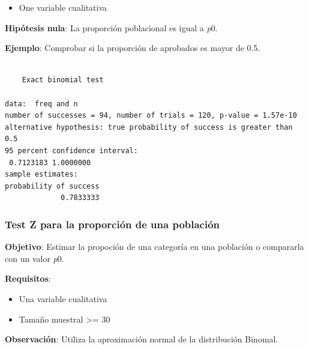 \documentclass[
  a4paper,
]{scrreport}
\newenvironment{Shaded}{\begin{snugshade}}{\end{snugshade}}
\newcommand{\AttributeTok}[1]{\textcolor[rgb]{0.40,0.45,0.13}{#1}}
\newcommand{\FloatTok}[1]{\textcolor[rgb]{0.68,0.00,0.00}{#1}}
\newcommand{\FunctionTok}[1]{\textcolor[rgb]{0.28,0.35,0.67}{#1}}
\newcommand{\NormalTok}[1]{\textcolor[rgb]{0.00,0.23,0.31}{#1}}
\newcommand{\OtherTok}[1]{\textcolor[rgb]{0.00,0.23,0.31}{#1}}
\newcommand{\SpecialCharTok}[1]{\textcolor[rgb]{0.37,0.37,0.37}{#1}}
\newcommand{\StringTok}[1]{\textcolor[rgb]{0.13,0.47,0.30}{#1}}
\providecommand{\tightlist}{%
  \setlength{\itemsep}{0pt}\setlength{\parskip}{0pt}}\usepackage{longtable,booktabs,array}
\theoremstyle{definition}
\theoremstyle{definition}
\theoremstyle{remark}
\begin{document}
\begin{itemize}
\tightlist
\item
  One variable cualitativa
\end{itemize}

\textbf{Hipótesis nula}: La proporción poblacional es igual a \emph{p}0.

\textbf{Ejemplo}: Comprobar si la proporción de aprobados es mayor de
0.5.

\begin{Shaded}
\end{Shaded}

\begin{verbatim}

    Exact binomial test

data:  freq and n
number of successes = 94, number of trials = 120, p-value = 1.57e-10
alternative hypothesis: true probability of success is greater than 0.5
95 percent confidence interval:
 0.7123183 1.0000000
sample estimates:
probability of success 
             0.7833333 
\end{verbatim}

\subsubsection{Test Z para la proporción de una
población}\label{test-z-para-la-proporciuxf3n-de-una-poblaciuxf3n}

\textbf{Objetivo}: Estimar la propoción de una categoría en una
población o compararla con un valor \emph{p}0.

\textbf{Requisitos}:

\begin{itemize}
\tightlist
\item
  Una variable cualitativa
\item
  Tamaño muestral \textgreater= 30
\end{itemize}

\textbf{Observación}: Utiliza la aproximación normal de la distribución
Binomal.
\end{document}
